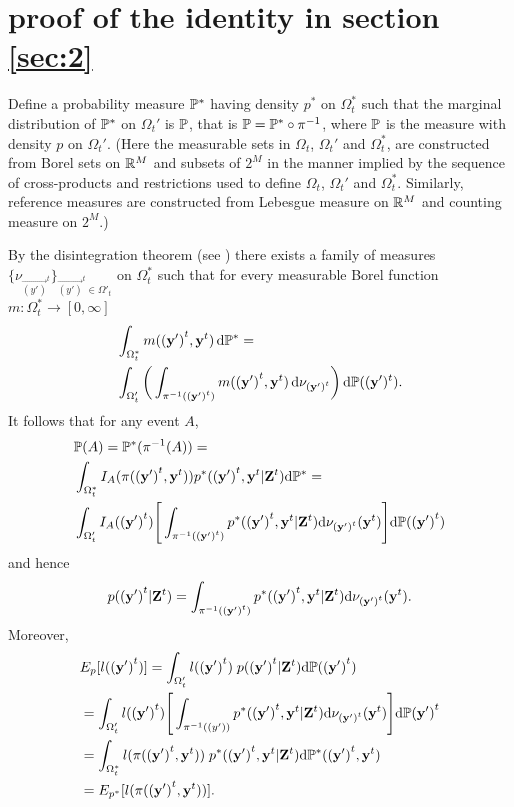 \section{proof of the identity in section \ref{sec:2} }

Define a probability measure $\P^*$ having density $p^*$ on $\Omega^*_t$ such that the marginal distribution of $\P^*$ on $\Omega_t'$ is $\P$, that is $\P = \P^* \circ \pi^{-1}$, where $\P$ is the measure with density $p$ on $\Omega_t'$. (Here the measurable sets in $\Omega_t$, $\Omega_t'$ and $\Omega_t^*$, are constructed from Borel sets on $\Real^M$ and subsets of $2^M$ in the manner implied by the sequence of cross-products and restrictions used to define $\Omega_t$, $\Omega_t'$ and $\Omega_t^*$. Similarly, reference measures are constructed from Lebesgue measure on $\Real^M$ and counting measure on $2^M$.)

By the disintegration theorem (see \cite{Rohlin}) there exists a family of measures $\{ \nu_{\vec{(y')}^t} \}_{\vec{(y')}^t \in \Omega'_t}$ on $\Omega^*_t$ such that for every measurable Borel function $m : \Omega^*_t \rightarrow [0, \infty]$
\begin{align*}
    &\int_{\Omega^*_t} m(\vec{(y')}^t, \vec{y}^t)\diff \P^* = \\
    & \int_{\Omega_t'} \bigg( \int_{\pi^{-1}(\vec{(y')}^t)} m(\vec{(y')}^t, \vec{y}^t) \diff \nu_{\vec{(y')}^t}  \bigg) \diff \P((\vec{y'})^t).
\end{align*}
It follows that for any event $A$,
\begin{align*}
    &\P(A) = \P^{*}(\pi^{-1}(A)) = \\
    &\int_{\Omega_t^*} I_A(\pi(\vec{(y')}^t, \vec{y}^t)) p^*(\vec{(y')}^t, \vec{y}^t | \vec{Z}^t) \D \P^*  = \\
    & \int_{\Omega_t'} I_A(\vec{(y')}^t) \Bigg[ \int_{\pi^{-1}(\vec{(y')}^t)} p^*(\vec{(y')}^t, \vec{y}^t | \vec{Z}^t) \D \nu_{\vec{(y')}^t} (\vec{y}^t) \Bigg] \D \P (\vec{(y')}^t)
\end{align*}
and hence
\begin{equation*}
    p(\vec{(y')}^t | \vec{Z}^t) = \int_{\pi^{-1}(\vec{(y')}^t)} p^*(\vec{(y')}^t, \vec{y}^t | \vec{Z}^t) \D \nu_{\vec{(y')}^t}(\vec{y}^t).
\end{equation*}
Moreover,
\begin{align*}
    &E_{p}[l(\vec{(y')}^{t})]  = \int_{\Omega_t'} l(\vec{(y')}^{t})\; p(\vec{(y')}^{t} | \vec{Z}^{t}) \D \P (\vec{(y')}^{t}) \\
    &= \int_{\Omega_t'} l(\vec{(y')}^{t})\Bigg[\int_{\pi^{-1}(\vec(y'))} p^*(\vec{(y')}^{t}, \vec{y}^{t} | \vec{Z}^{t}) \D \nu_{\vec{(y')}^t}(\vec{y}^t) \Bigg] \D \P \vec{(y')}^{t} \\ 
    &= \int_{\Omega_t^*} l(\pi(\vec{(y')}^{t}, \vec{y}^{t}))\; p^*(\vec{(y')}^{t}, \vec{y}^{t} | \vec{Z}^{t}) \D \P^*(\vec{(y')}^t, \vec{y}^t) \\ 
    &= E_{p^*}[l(\pi (\vec{(y')}^{t}, \vec{y}^{t}))].
\end{align*}



